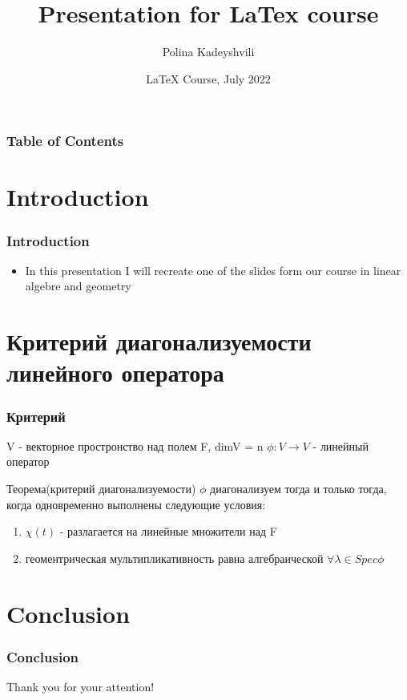 \documentclass{beamer}
\title[About Beamer] 
{Presentation for LaTex course}
\author[Kadeyshvili] %
{Polina Kadeyshvili\inst{1}}
\date[LTXC 2022] %
{LaTeX Course, July 2022}
\begin{document}
\frame{\titlepage}

\begin{frame}
\frametitle{Table of Contents}
\tableofcontents
\end{frame}


\section{Introduction}

\begin{frame}
\frametitle{Introduction}

\begin{itemize}
    \item In this presentation I will recreate one of the slides form our course in linear algebre and geometry

\end{itemize}
\end{frame}






\section{Критерий диагонализуемости линейного оператора}
\begin{frame}
\frametitle{Критерий}
\begin{center}
    V - векторное простронство над полем F, dimV = n $\phi : V \xrightarrow{} V $ - линейный оператор
\end{center}
\begin{block}{Теорема(критерий диагонализуемости)}
$\phi$ 
\text диагонализуем тогда и только тогда, когда одновременно выполнены следующие условия:\\
\begin{enumerate}  
	\item $\chi(t)$ - разлагается на линейные множители над F
	\item геоментрическая мультипликативность равна алгебраической $\forall \lambda \in Spec\phi$
\end{enumerate}
\end{block}
\end{frame}



\section{Conclusion}
\begin{frame}
\frametitle{Conclusion}
\begin{center}
    Thank you for your attention!
\end{center}
\end{frame}
\end{document}
